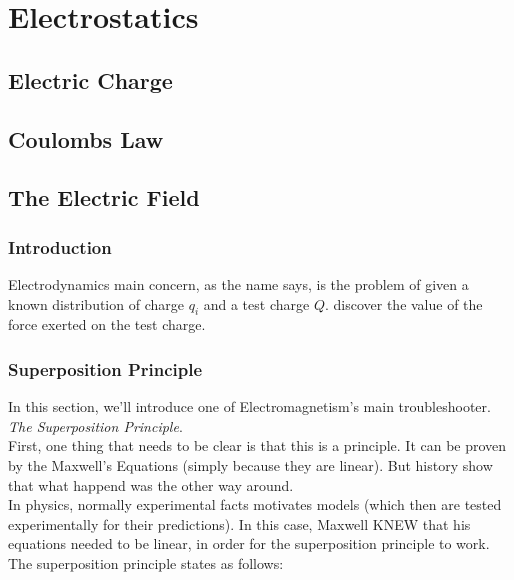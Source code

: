 \setchapterpreamble[u]{\margintoc}
\chapter{Electrostatics}

\section{Electric Charge}

\section{Coulombs Law}

\section{The Electric Field}
	\subsection{Introduction}
		Electrodynamics main concern, as the name says, is the problem of given a known distribution of charge ${q_i}$ and a test charge $Q$. discover the value of the force exerted on the test charge.


	
	\subsection{Superposition Principle}
		In this section, we'll introduce one of Electromagnetism's main troubleshooter. \textit{The Superposition Principle}.\\
		First, one thing that needs to be clear is that this is a principle. It can be proven by the Maxwell's Equations (simply because they are linear). But history show that what happend was the other way around.\\%
		In physics, normally experimental facts motivates models (which then are tested experimentally for their predictions). In this case, Maxwell KNEW that his equations needed to be linear, in order for the superposition principle to work.\\
		The superposition principle states as follows:

